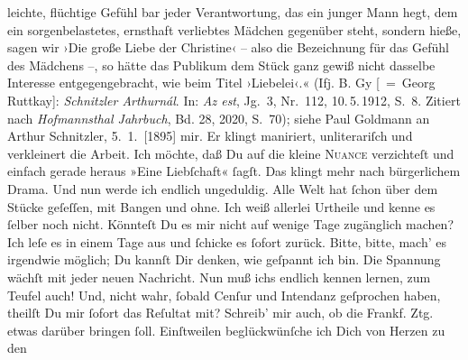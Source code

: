 \begin{ledgroupsized}[t]{13cm}
{{{                     leichte, flüchtige Gefühl bar jeder Verantwortung, das ein junger Mann hegt,
                     dem ein sorgenbelastetes, ernsthaft verliebtes Mädchen gegenüber steht, sondern
                     hieße, sagen wir ›Die große Liebe der Christine‹ – also die Bezeichnung für das
                     Gefühl des Mädchens –, so hätte das Publikum dem Stück ganz gewiß nicht
                     dasselbe Interesse entgegengebracht, wie beim Titel ›Liebelei‹.« (Ifj. B. Gy [ = Georg Ruttkay]: \emph{Schnitzler Arthurnál}. In: \emph{Az est}, Jg. 3, Nr. 112, 10. 5. 1912, S. 8. Zitiert nach \emph{Hofmannsthal Jahrbuch}, Bd. 28, 2020, S. 70);
                     siehe Paul Goldmann an Arthur Schnitzler, 5. 1. [1895]}}}\label{K_L02630-4h} mir. {\pb}Er klingt maniriert, unliterariſch und
               verkleinert die Arbeit. Ich möchte, daß Du auf die kleine \textsc{Nuance} verzichteſt und einfach gerade heraus »Eine Liebſchaft« ſagſt. Das
               klingt mehr nach bürgerlichem Drama. Und nun werde ich endlich ungeduldig. Alle Welt
               hat ſchon über dem Stücke
               geſeſſen, mit  Bangen und ohne. Ich weiß allerlei
               Urtheile und kenne es ſelber noch nicht. Könnteſt Du es mir nicht auf wenige Tage
               zugänglich machen? Ich leſe es in einem Tage aus und ſchicke es ſofort zurück. Bitte,
               bitte, mach’ es irgendwie möglich; Du kannſt Dir denken, wie geſpannt {\pb}ich bin. Die Spannung wächſt mit jeder neuen
               Nachricht. Nun muß ichs endlich kennen lernen, zum Teufel auch! Und, nicht wahr,
               ſobald Cenſur und Intendanz geſprochen haben, theilſt Du mir ſofort das Reſultat mit?
               Schreib’ mir auch, ob die Frankf. Ztg. etwas
               darüber bringen ſoll. Einſtweilen beglückwünſche ich Dich von Herzen zu den

\end{ledgroupsized}
